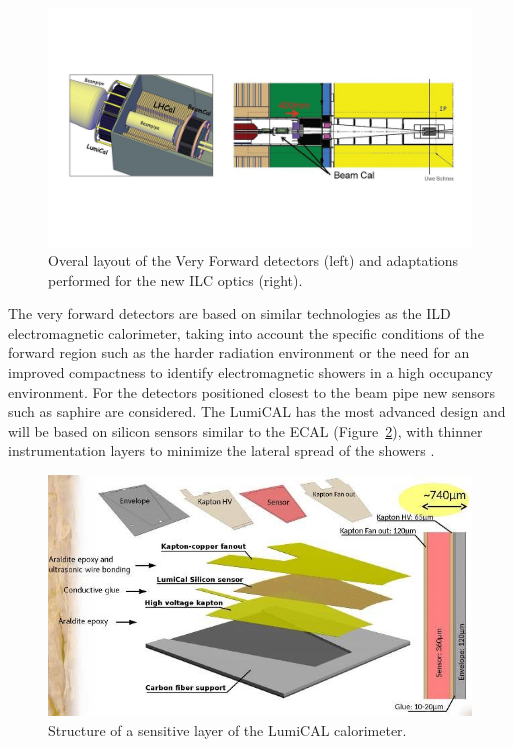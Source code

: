 \begin{figure}[t!]
\centering
\includegraphics[width=1.0\hsize]{Detector/fig/VFS.jpg}
\caption{Overal layout of the Very Forward detectors (left) and adaptations performed for the new ILC optics (right).}
\label{fig:det:VFS}
\end{figure}

The very forward detectors are based on similar technologies as the ILD electromagnetic calorimeter, taking into account the specific conditions of the forward region such as the harder radiation environment or the need for an improved compactness to identify electromagnetic showers in a high occupancy environment. For the detectors positioned closest to the beam pipe new sensors such as saphire are considered. The LumiCAL has the most advanced design and will be based on silicon sensors similar to the ECAL (Figure~\ref{fig:det:lumical}), with thinner instrumentation layers to minimize the lateral spread of the showers .     

\begin{figure}[t!]
\centering
\includegraphics[width=0.8\hsize]{Detector/fig/lumical_layer.jpg}
\caption{Structure of a sensitive layer of the LumiCAL calorimeter.}
\label{fig:det:lumical}
\end{figure}

